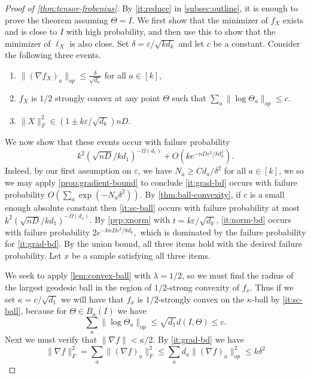 \documentclass{article}
\newcommand\eps{\varepsilon}
\newcommand\samp{x}
\newcommand\rv{X}
\newcommand{\CF}[1]{{\color{purple}[CF: #1]}}
\begin{document}
\begin{proof}[Proof of \cref{thm:tensor-frobenius}]By \cref{it:reduce} in \cref{subsec:outline}, it is enough to prove the theorem assuming $\Theta = I$. We first show that the minimizer of $f_\rv$ exists and is close to $I$ with high probability, and then use this to show that the minimizer of $\ell_\rv$ is also close.  Set $\delta = \eps/\sqrt{k d_k}$ and let $c$ be a constant. Consider the following three events.
\begin{enumerate}
\item\label{it:grad-bd} $\|(\nabla f_\rv)_{a}\|_{op} \leq \frac{\delta}{\sqrt{d_{a}}}$ for all $a \in [k]$,
\item\label{it:sc-ball} $f_\rv$ is $1/2$ strongly convex at any point $\Theta$ such that $\sum_a \|\log \Theta_a\|_{op} \leq  c.$
\item\label{it:norm-bd} $\| \rv\|_F^2 \in (1 \pm k \eps/\sqrt{d_k}) nD.$
\end{enumerate}
We now show that these events occur with failure probability $$k^2 \left(\sqrt{nD} / kd_1 \right)^{ - \Omega(d_1)} + O(k e^{ - nD \eps^2 / k d_k^2}).$$ Indeed, by our first assumption on $\eps$, we have $N_a \geq C d_a/\delta^2$ for all $a \in [k]$, we so we may apply \cref{prop:gradient-bound} to conclude \cref{it:grad-bd} occurs with failure probability $O\left( \sum_a \exp ( - N_a \delta^2)\right)$. 
By \cref{thm:ball-convexity}, if $c$ is a small enough absolute constant then \cref{it:sc-ball} occurs with failure probability at most $k^2 \left(\sqrt{nD} / kd_1 \right)^{ - \Omega(d_1)}$. By \cref{prp:xnorm} with $t = k \eps/\sqrt{d_k}$, \cref{it:norm-bd} occurs with failure probability $2e^{- k nD \eps^2/8 d_k},$ which is dominated by the failure probability for \cref{it:grad-bd}. By the union bound, all three items hold with the desired failure probability. Let $\samp$ be a sample satisfying all three items.


We seek to apply \cref{lem:convex-ball} with $\lambda = 1/2$, so we must find the radius of the largest geodesic ball in the region of $1/2$-strong convexity of $f_\samp$. Thus if we set $\kappa = c/\sqrt{d_1}$ we will have that $f_\samp$ is $1/2$-strongly convex on the $\kappa$-ball by \cref{it:sc-ball}, because for $\Theta \in B_\kappa(I)$ we have
$$ \sum_a \|\log \Theta_a\|_{op} \leq \sqrt{d_1} d(I, \Theta) \leq c.$$
Next we must verify that $\|\nabla f\| < \kappa/2$. By \cref{it:grad-bd} we have
\[  \|\nabla f\|_F^{2} = \sum_{a} \|(\nabla f)_{a}\|_{F}^{2} \leq \sum_{a} d_a \|(\nabla f)_{a}\|_{op}^{2} \leq  k \delta^{2} \]


\end{proof}
\end{document}
